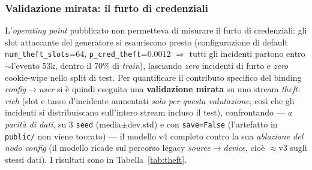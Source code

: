 \documentclass[11pt,a4paper]{report}
\begin{document}
\subsubsection{Validazione mirata: il furto di credenziali}

L'\textit{operating point} pubblicato non permetteva di misurare il furto di credenziali: gli slot attaccante del generatore si esauriscono presto (configurazione di default \texttt{num\_theft\_slots}=64, \texttt{p\_cred\_theft}=0.0012 $\Rightarrow$ tutti gli incidenti partono entro $\sim$l'evento 53k, dentro il 70\% di \emph{train}), lasciando \emph{zero} incidenti di furto e \emph{zero} cookie-wipe nello split di test. Per quantificare il contributo specifico del binding \textit{config}$\rightarrow$\textit{user} si è quindi eseguita una \textbf{validazione mirata} su uno stream \emph{theft-rich} (slot e tasso d'incidente aumentati \emph{solo per questa valutazione}, così che gli incidenti si distribuiscano sull'intero stream incluso il test), confrontando — \emph{a parità di dati}, su 3 \texttt{seed} (media$\pm$dev.std) e con \texttt{save=False} (l'artefatto in \texttt{public/} non viene toccato) — il modello v4 completo contro la sua \emph{ablazione del nodo config} (il modello ricade sul percorso legacy \textit{source}$\rightarrow$\textit{device}, cioè $\approx$v3 sugli stessi dati). I risultati sono in Tabella~\ref{tab:theft}.
\end{document}
